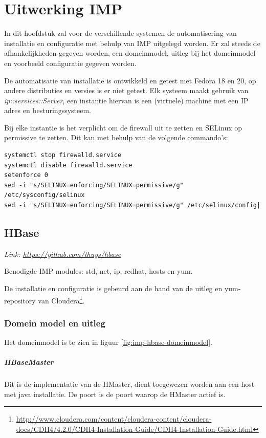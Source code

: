 \chapter{Uitwerking IMP} \label{chap:AppendixUitwerkingIMP}
In dit hoofdstuk zal voor de verschillende systemen de automatisering van installatie en configuratie met behulp van IMP uitgelegd worden. Er zal steeds de afhankelijkheden gegeven worden, een domeinmodel, uitleg bij het domeinmodel en voorbeeld configuratie gegeven worden. 

De automatisatie van installatie is ontwikkeld en getest met Fedora 18 en 20, op andere distributies en versies is er niet getest. 
Elk systeem maakt gebruik van \textit{ip::services::Server}, een instantie hiervan is een (virtuele) machine met een IP adres en besturingssysteem. 

Bij elke instantie is het verplicht om de firewall uit te zetten en SELinux op permissive te zetten. Dit kan met behulp van de volgende commando's: 
\begin{lstlisting}[frame=single, breaklines=true]
systemctl stop firewalld.service  
systemctl disable firewalld.service  
setenforce 0
sed -i "s/SELINUX=enforcing/SELINUX=permissive/g" /etc/sysconfig/selinux
sed -i "s/SELINUX=enforcing/SELINUX=permissive/g" /etc/selinux/config|
\end{lstlisting}

\section{HBase}
\textit{Link: \url{https://github.com/thuys/hbase}}

Benodigde IMP modules: std, net, ip, redhat, hosts en yum. 

De installatie en configuratie is gebeurd aan de hand van de uitleg en yum-repository van Cloudera\footnote{\url{http://www.cloudera.com/content/cloudera-content/cloudera-docs/CDH4/4.2.0/CDH4-Installation-Guide/CDH4-Installation-Guide.html}}. 

\subsection{Domein model en uitleg}
Het domeinmodel is te zien in figuur \ref{fig:imp-hbase-domeinmodel}.

\paragraph{HBaseMaster} Dit is de implementatie van de HMaster, dient toegewezen worden aan een host met java installatie. De poort is de poort waarop de HMaster actief is. 
 
